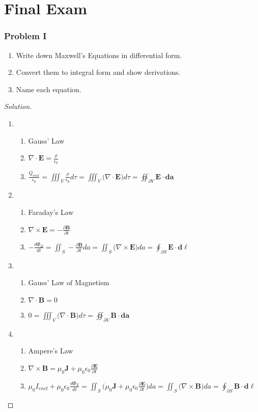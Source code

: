 \documentclass[oneside]{book}
\theoremstyle{definition}
\newcommand*\B[1]{\mathbf{#1}}
\begin{document}
\section{Final Exam}

\subsubsection{Problem I}
\begin{enumerate}
\item Write down Maxwell's Equations in differential form.
\item Convert them to integral form and show derivations.
\item Name each equation.
\end{enumerate}
\begin{proof}[Solution]
\
\begin{enumerate}
\item
	\begin{enumerate}
	\item Gauss' Law
	\item$\nabla \cdot \B{E} = \frac{\rho}{\epsilon_0}$
	\item $\frac{Q_{encl}}{\epsilon_0}=\iiint_{V} \frac{\rho}{\epsilon_0}d\tau=\iiint_{V} \big(\nabla \cdot \B{E}\big) d\tau = \oiint_{\partial V} \B{E}\cdot \B{da}$
	\end{enumerate}
\item
	\begin{enumerate}
	\item Faraday's Law
	\item $\nabla \times \B{E} = -\frac{\partial \B{B}}{\partial t}$
	\item $-\frac{d \Phi_{B}}{dt} = \iint_{S} -\frac{\partial \B{B}}{\partial t}da = \iint_{S} \big(\nabla \times \B{E}\big)da = \oint_{\partial S}\B{E}\cdot \B{d\ell}$
	\end{enumerate}
\item 
	\begin{enumerate}
	\item Gauss' Law of Magnetism
	\item $\nabla \cdot \B{B} = 0$
	\item $0 = \iiint_{V} \big(\nabla \cdot\B{B}\big)d\tau = \oiint_{\partial V} \B{B}\cdot \B{da}$
	\end{enumerate}
\item
	\begin{enumerate}
	\item Ampere's Law
	\item $\nabla \times \B{B} = \mu_0 \B{J} + \mu_0 \epsilon_0 \frac{\partial \B{E}}{\partial t}$
	\item $\mu_0 I_{encl}+ \mu_0 \epsilon_0 \frac{d\Phi_{E}}{dt} = \iint_{S}\big(\mu_0 \B{J} + \mu_0 \epsilon_0 \frac{\partial \B{E}}{\partial t}\big)da = \iint_{S}\big(\nabla \times \B{B}\big)da = \oint_{\partial S}\B{B}\cdot \B{d\ell}$
	\end{enumerate}
\end{enumerate}
\end{proof}
\end{document}
